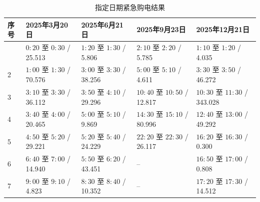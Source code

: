 \begin{table}[H]
    \centering
    \caption{指定日期紧急购电结果}
    \label{tab:q2_emergency_purchase}
    \scriptsize
    \setlength{\tabcolsep}{3pt}
    \renewcommand{\arraystretch}{1.15}

    \begin{tabularx}{\textwidth}
    {|>{\centering\arraybackslash}p{}
     |>{\centering\arraybackslash}X
     |>{\centering\arraybackslash}X
     |>{\centering\arraybackslash}X
     |>{\centering\arraybackslash}X|}
        \hline
        \rowcolor{headerblue}
        \textbf{序号}
        & \textbf{2025年3月20日}
        & \textbf{2025年6月21日}
        & \textbf{2025年9月23日}
        & \textbf{2025年12月21日} \\
        \hline

        1
        & \(0{:}20\) 至 \(0{:}30\) / 25.513
        & \(1{:}20\) 至 \(1{:}30\) / 5.806
        & \(2{:}10\) 至 \(2{:}20\) / 5.785
        & \(1{:}10\) 至 \(1{:}20\) / 4.035 \\
        \hline

        2
        & \(1{:}00\) 至 \(1{:}30\) / 70.576
        & \(3{:}00\) 至 \(3{:}30\) / 38.256
        & \(5{:}00\) 至 \(5{:}10\) / 4.611
        & \(3{:}30\) 至 \(3{:}50\) / 46.272 \\
        \hline

        3
        & \(3{:}10\) 至 \(3{:}30\) / 36.112
        & \(3{:}50\) 至 \(4{:}10\) / 29.296
        & \(10{:}40\) 至 \(10{:}50\) / 12.817
        & \(10{:}30\) 至 \(11{:}30\) / 343.028 \\
        \hline

        4
        & \(3{:}40\) 至 \(4{:}00\) / 20.465
        & \(5{:}00\) 至 \(5{:}10\) / 9.869
        & \(14{:}30\) 至 \(15{:}10\) / 80.996
        & \(12{:}40\) 至 \(13{:}00\) / 49.292 \\
        \hline

        5
        & \(4{:}50\) 至 \(5{:}20\) / 29.221
        & \(5{:}20\) 至 \(5{:}40\) / 24.229
        & \(22{:}20\) 至 \(22{:}30\) / 26.117
        & \(16{:}20\) 至 \(16{:}30\) / 0.300 \\
        \hline

        6
        & \(6{:}40\) 至 \(7{:}00\) / 14.940
        & \(5{:}50\) 至 \(6{:}20\) / 43.451
        & --
        & \(16{:}50\) 至 \(17{:}00\) / 0.808 \\
        \hline

        7
        & \(9{:}00\) 至 \(9{:}10\) / 4.823
        & \(8{:}30\) 至 \(8{:}40\) / 10.352
        & --
        & \(17{:}20\) 至 \(17{:}30\) / 14.512 \\
        \hline


\end{tabularx}
\end{table}

